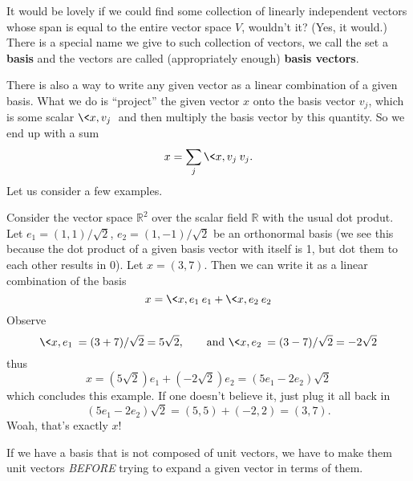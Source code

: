 It would be lovely if we could find some collection of
linearly independent vectors whose span is equal to the
entire vector space $V$, wouldn't it? (Yes, it would.) There
is a special name we give to such collection of vectors, we
call the set a \textbf{basis} and the vectors
are called (appropriately enough) \textbf{basis vectors}.

There is also a way to write any given vector as a linear
combination of a given basis. What we do is ``project'' the
given vector $x$ onto the basis vector $v_j$, which is some
scalar $\<x,v_j\>$ and then multiply the basis vector by
this quantity. So we end up with a sum
\begin{equation}
x = \sum_{j}\<x,v_j\>v_j.
\end{equation}
Let us consider a few examples.

\begin{ex}
Consider the vector space $\mathbb{R}^2$ over the scalar
field $\mathbb{R}$ with the usual dot produt. Let $e_1 =
(1,1)/\sqrt{2}$, $e_2=(1,-1)/\sqrt{2}$ be an orthonormal
basis (we see this because the dot product of a given basis
vector with itself is 1, but dot them to each other results in
0). Let $x=(3,7)$. Then we can write it as a linear
combination of the basis
\begin{equation}
x = \<x,e_1\>e_1 + \<x,e_2\>e_2
\end{equation}
Observe
\begin{equation}
\<x,e_1\> = (3+7)/\sqrt{2}=5\sqrt{2},\qquad\text{and }\<x,e_2\>=(3-7)/\sqrt{2}=-2\sqrt{2}
\end{equation}
thus
\begin{equation}
x = (5\sqrt{2})e_1 + (-2\sqrt{2})e_2 = (5e_1-2e_2)\sqrt{2}
\end{equation}
which concludes this example. If one doesn't believe it,
just plug it all back in
\begin{equation}
(5e_1-2e_2)\sqrt{2} = (5,5)+(-2,2) = (3,7).
\end{equation}
Woah, that's exactly $x$!
\end{ex}

\begin{rmk}
If we have a basis that is not composed of unit vectors, we
have to make them unit vectors \emph{BEFORE} trying to
expand a given vector in terms of them.
\end{rmk}

